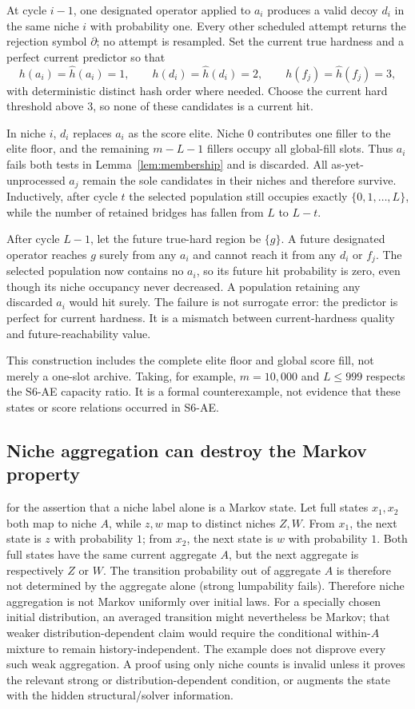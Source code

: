 At cycle $i-1$, one designated operator applied to $a_i$ produces a valid
decoy $d_i$ in the same niche $i$ with probability one. Every other scheduled
attempt returns the rejection symbol $\partial$; no attempt is resampled. Set
the current true hardness and a perfect current predictor so that
\[
 h(a_i)=\widehat h(a_i)=1,\qquad
 h(d_i)=\widehat h(d_i)=2,\qquad
 h(f_j)=\widehat h(f_j)=3,
\]
with deterministic distinct hash order where needed. Choose the current hard
threshold above $3$, so none of these candidates is a current hit.

In niche $i$, $d_i$ replaces $a_i$ as the score elite. Niche $0$ contributes
one filler to the elite floor, and the remaining $m-L-1$ fillers occupy all
global-fill slots. Thus $a_i$ fails both tests in
Lemma~\ref{lem:membership} and is discarded. All as-yet-unprocessed $a_j$
remain the sole candidates in their niches and therefore survive. Inductively,
after cycle $t$ the selected population still occupies exactly
$\{0,1,\ldots,L\}$, while the number of retained bridges has fallen from $L$
to $L-t$.

After cycle $L-1$, let the future true-hard region be $\{g\}$. A future
designated operator reaches $g$ surely from any $a_i$ and cannot reach it from
any $d_i$ or $f_j$. The selected population now contains no $a_i$, so its
future hit probability is zero, even though its niche occupancy never
decreased. A population retaining any discarded $a_i$ would hit surely. The
failure is not surrogate error: the predictor is perfect for current hardness.
It is a mismatch between current-hardness quality and future-reachability
value.

This construction includes the complete elite floor and global score fill,
not merely a one-slot archive. Taking, for example, $m=10{,}000$ and
$L\leq999$ respects the S6-AE capacity ratio. It is a formal counterexample,
not evidence that these states or score relations occurred in S6-AE.

\subsection{Niche aggregation can destroy the Markov property}
 for the assertion that a niche label alone is a Markov
state. Let full states $x_1,x_2$ both map to niche $A$, while $z,w$ map to
distinct niches $Z,W$. From $x_1$, the next state is $z$ with probability
$1$; from $x_2$, the next state is $w$ with probability $1$. Both full states
have the same current aggregate $A$, but the next aggregate is respectively
$Z$ or $W$. The transition probability out of aggregate $A$ is therefore
not determined by the aggregate alone (strong lumpability fails). Therefore
niche aggregation is not Markov uniformly over initial laws. For a specially
chosen initial distribution, an averaged transition might nevertheless be
Markov; that weaker distribution-dependent claim would require the
conditional within-$A$ mixture to remain history-independent. The example
does not disprove every such weak aggregation. A proof using only niche counts
is invalid unless it proves the relevant strong or distribution-dependent
condition, or augments the state with the hidden structural/solver
information.


